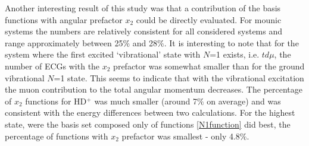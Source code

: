 Another interesting result of this study was that a contribution of the basis 
functions with angular prefactor $x_2$ could be directly evaluated.
For mounic systems the numbers are relatively consistent for all considered systems 
and range approximately between 25$\%$ and 28$\%$. It is interesting to note that for 
the system where the first excited ‘vibrational’ state with $N$=1 exists, i.e. $td\mu$, 
the number of ECGs with the $x_2$ prefactor was somewhat smaller than for the ground vibrational $N$=1 state. This seems to indicate that with the vibrational excitation 
the muon contribution to the total angular momentum decreases.
The percentage of $x_2$ functions for HD$^+$ was much smaller (around 7$\%$ on average)
and was consistent with the energy differences between two calculations.
For the highest state, were the basis set composed only of functions \ref{N1function}
did best, the percentage of functions with $x_2$ prefactor was smallest - only 4.8$\%$.  










